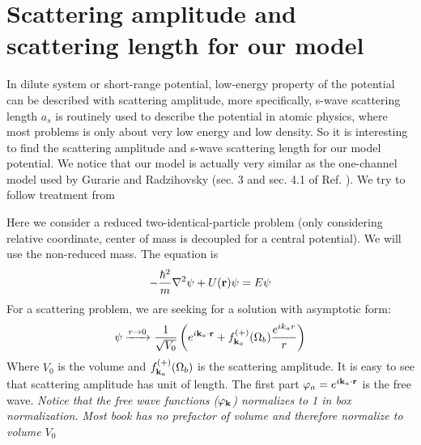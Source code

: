 \section{Scattering amplitude and scattering length for our model \label{sec:scatter}}
In dilute system or short-range potential, low-energy property of the potential can be described with scattering amplitude\cite{Pethick,Fetter}, more specifically, s-wave scattering length $a_{s}$ is routinely used to describe the potential in atomic physics, where most problems is only about very low energy and low density.  So it is interesting to find the scattering amplitude and s-wave scattering length for our model potential. We notice that our model is actually very similar as the one-channel model used by Gurarie and Radzihovsky (sec. 3 and sec. 4.1 of Ref. \cite{GurarieNarrow}).  We try to follow treatment from \cite{Messiah,GurarieNarrow}

Here we consider a reduced two-identical-particle problem (only considering relative coordinate, center of mass is decoupled for a central potential).  We will use the non-reduced mass.  The \sch equation is 
\begin{equation}
-\frac{\hbar^{2}}{m}\nabla^{2}\psi+U(\mathbf{r})\psi=E\psi
\end{equation}
For a scattering problem, we are seeking for a solution with asymptotic form:
\begin{equation}
\psi\xrightarrow{r\rightarrow0}\frac{1}{\sqrt{V_{0}}}\left(e^{i\mathbf{k}_{a}\cdot\mathbf{r}}+f_{\mathbf{k}_{a}}^{(+)}(\Omega_{b})\frac{e^{ik_{a}r}}{r}\right)
\end{equation}
Where $V_{0}$ is the volume and $f_{\mathbf{k}_{a}}^{(+)}(\Omega_{b})$ is the scattering amplitude.  It is easy to see that scattering amplitude has unit of length.  The first part $\varphi_{a}=e^{i\mathbf{k}_{a}\cdot\mathbf{r}}$ is the free wave.  \emph{Notice that the free wave functions  ($\varphi_{\mathbf{k}}$) normalizes to 1 in box normalization.  Most book has no prefactor of volume and therefore normalize to volume $V_{0}$}

